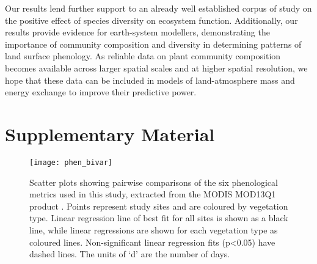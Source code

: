 \documentclass[11pt,a4paper]{article}
\newcommand{\beginsupplement}{%
	\setcounter{table}{0}
	\renewcommand{\thetable}{S\arabic{table}}%
	\setcounter{figure}{0}
	\renewcommand{\thefigure}{S\arabic{figure}}%
	}
\begin{document}
Our results lend further support to an already well established corpus of study on the positive effect of species diversity on ecosystem function. Additionally, our results provide evidence for earth-system modellers, demonstrating the importance of community composition and diversity in determining patterns of land surface phenology. As reliable data on plant community composition becomes available across larger spatial scales and at higher spatial resolution, we hope that these data can be included in models of land-atmosphere mass and energy exchange to improve their predictive power.

\printbibliography

\section{Supplementary Material}
\beginsupplement

\begin{figure}[H]
\centering
	\texttt{[image: phen\_bivar]}
	\caption{Scatter plots showing pairwise comparisons of the six phenological metrics used in this study, extracted from the MODIS MOD13Q1 product \citep{MOD13Q1}. Points represent study sites and are coloured by vegetation type. Linear regression line of best fit for all sites is shown as a black line, while linear regressions are shown for each vegetation type as coloured lines. Non-significant linear regression fits (p<0.05) have dashed lines. The units of `d' are the number of days.}
	\label{phen_bivar}
\end{figure}
\end{document}
